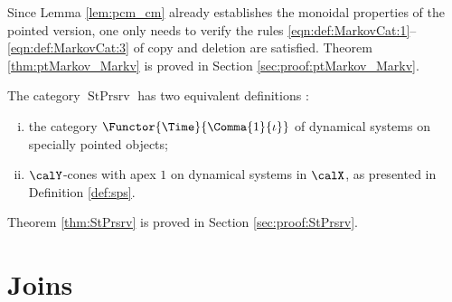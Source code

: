 \documentclass[12pt,oneside,pb-diagram]{article}
\DeclareMathOperator{\sps}{StPrsrv}
\begin{document}
Since Lemma \ref{lem:pcm_cm} already establishes the monoidal properties of the pointed version, one only needs to verify the rules \eqref{eqn:def:MarkovCat:1}--\eqref{eqn:def:MarkovCat:3} of copy and deletion are  satisfied. Theorem \ref{thm:ptMarkov_Markv} is proved in Section \ref{sec:proof:ptMarkov_Markv}.

\begin{theorem}  \label{thm:StPrsrv}
	The category $\sps$ has two equivalent definitions :
	\begin{enumerate} [(i)]
		\item the category $\Functor{\Time}{\Comma{1}{\iota}}$ of dynamical systems on specially pointed objects; 
		\item $\calY$-cones with apex $1$ on dynamical systems in $\calX$, as presented in Definition \ref{def:sps}.
	\end{enumerate}
\end{theorem}
Theorem \ref{thm:StPrsrv} is proved in Section \ref{sec:proof:StPrsrv}.

\section{Joins} \label{sec:join}
\end{document}
